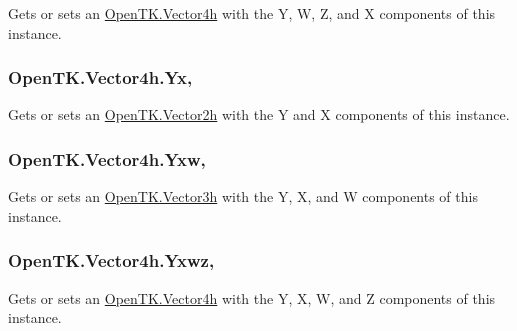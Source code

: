 Gets or sets an \hyperlink{struct_open_t_k_1_1_vector4h}{Open\-T\-K.\-Vector4h} with the Y, W, Z, and X components of this instance. 

\hypertarget{struct_open_t_k_1_1_vector4h_a20678ddeb822b11239ca112683c9e8a0}{
\subsubsection[{Yx}]{ Open\-T\-K.\-Vector4h.\-Yx\hspace{0.3cm}{\ttfamily [get]}, {\ttfamily [set]}}}\label{struct_open_t_k_1_1_vector4h_a20678ddeb822b11239ca112683c9e8a0}


Gets or sets an \hyperlink{struct_open_t_k_1_1_vector2h}{Open\-T\-K.\-Vector2h} with the Y and X components of this instance. 

\hypertarget{struct_open_t_k_1_1_vector4h_a2ddc2afb5327c10e041e1bb2c7fada6d}{
\subsubsection[{Yxw}]{ Open\-T\-K.\-Vector4h.\-Yxw\hspace{0.3cm}{\ttfamily [get]}, {\ttfamily [set]}}}\label{struct_open_t_k_1_1_vector4h_a2ddc2afb5327c10e041e1bb2c7fada6d}


Gets or sets an \hyperlink{struct_open_t_k_1_1_vector3h}{Open\-T\-K.\-Vector3h} with the Y, X, and W components of this instance. 

\hypertarget{struct_open_t_k_1_1_vector4h_a00eee3f6d6254b784f054b25a43fbed5}{
\subsubsection[{Yxwz}]{ Open\-T\-K.\-Vector4h.\-Yxwz\hspace{0.3cm}{\ttfamily [get]}, {\ttfamily [set]}}}\label{struct_open_t_k_1_1_vector4h_a00eee3f6d6254b784f054b25a43fbed5}


Gets or sets an \hyperlink{struct_open_t_k_1_1_vector4h}{Open\-T\-K.\-Vector4h} with the Y, X, W, and Z components of this instance. 

